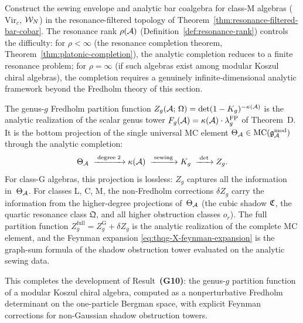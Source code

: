 \begin{openproblem}%
\label{prob:thqg-X-W-algebra-analytic}%
%
Construct the sewing envelope and analytic bar coalgebra for
class-M algebras ($\mathrm{Vir}_c$, $\mathcal{W}_N$) in the
resonance-filtered topology of
Theorem~\ref{thm:resonance-filtered-bar-cobar}.
The resonance rank $\rho(\mathcal{A})$
(Definition~\ref{def:resonance-rank}) controls the
difficulty: for $\rho < \infty$ (the resonance completion
theorem, Theorem~\ref{thm:platonic-completion}), the
analytic completion reduces to a finite resonance problem;
for $\rho = \infty$ (if such algebras exist among modular
Koszul chiral algebras), the completion requires a genuinely
infinite-dimensional analytic framework beyond the Fredholm
theory of this section.
\end{openproblem}

\begin{remark}%
\label{rem:thqg-X-fredholm-summary}%
%
The genus-$g$ Fredholm partition function
$Z_g(\mathcal{A};\,\Omega) = \det(1 - K_g)^{-\kappa(\mathcal{A})}$
is the analytic realization of the scalar genus tower
$F_g(\mathcal{A}) = \kappa(\mathcal{A}) \cdot \lambda_g^{\mathrm{FP}}$ of Theorem~D. It is the bottom projection of the single
universal MC element
$\Theta_{\mathcal{A}} \in \mathrm{MC}(\mathfrak{g}_{\mathcal{A}}^{\mathrm{mod}})$
through the analytic completion:
\[
\Theta_{\mathcal{A}}
\;\xrightarrow{\;\mathrm{degree}\;2\;}
\kappa(\mathcal{A})
\;\xrightarrow{\;\mathrm{sewing}\;}
K_g
\;\xrightarrow{\;\det\;}
Z_g.
\]
For class-G algebras, this projection is lossless: $Z_g$
captures all the information in~$\Theta_{\mathcal{A}}$. For classes
L, C, M, the non-Fredholm corrections $\delta Z_g$ carry the
information from the higher-degree projections of~$\Theta_{\mathcal{A}}$
(the cubic shadow $\mathfrak{C}$, the quartic resonance class
$\mathfrak{Q}$, and all higher obstruction classes $o_r$).
The full partition function
$Z_g^{\mathrm{full}} = Z_g^{\mathrm{G}} + \delta Z_g$
is the analytic realization of the complete MC element, and
the Feynman expansion \eqref{eq:thqg-X-feynman-expansion}
is the graph-sum formula of the shadow obstruction tower
evaluated on the analytic sewing data.

This completes the development of Result~\textbf{(G10)}: the
genus-$g$ partition function of a modular Koszul chiral algebra,
computed as a nonperturbative Fredholm determinant on the
one-particle Bergman space, with explicit Feynman corrections
for non-Gaussian shadow obstruction towers.
\end{remark}

